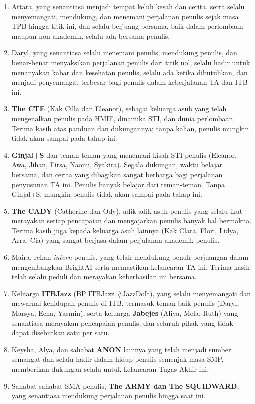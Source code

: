 \begin{enumerate}
    \item Attara, yang senantiasa menjadi tempat keluh kesah dan cerita, serta selalu menyemangati, mendukung, dan menemani perjalanan penulis sejak masa TPB hingga titik ini, dan selalu berjuang bersama, baik dalam perlombaan maupun non-akademik, selalu ada bersama penulis.
    \item Daryl, yang senantiasa selalu menemani penulis, mendukung penulis, dan benar-benar menyaksikan perjalanan penulis dari titik nol, selalu hadir untuk menanyakan kabar dan kesehatan penulis, selalu ada ketika dibutuhkan, dan menjadi penyemangat terbesar bagi penulis dalam keberjalanan TA dan ITB ini.
    \item \textbf{The CTE} (Kak Cilla dan Eleanor), sebagai keluarga asuh yang telah mengenalkan penulis pada HMIF, dinamika STI, dan dunia perlombaan. Terima kasih atas panduan dan dukungannya; tanpa kalian, penulis mungkin tidak akan sampai pada tahap ini.
    \item \textbf{Ginjal+S} dan teman-teman yang menemani kisah STI penulis (Eleanor, Awa, Jihan, Firsa, Naomi, Syakira). Segala dukungan, waktu belajar bersama, dan cerita yang dibagikan sangat berharga bagi perjalanan penyusunan TA ini. Penulis banyak belajar dari teman-teman. Tanpa Ginjal+S, mungkin penulis tidak akan sampai pada tahap ini.
    \item \textbf{The CADY} (Catherine dan Ody), adik-adik asuh penulis yang selalu ikut merayakan setiap pencapaian dan mengajarkan penulis banyak hal bermakna. Terima kasih juga kepada keluarga asuh lainnya (Kak Clara, Flori, Lidya, Arra, Cia) yang sangat berjasa dalam perjalanan akademik penulis.
    \item Maira, rekan \textit{intern} penulis, yang telah mendukung penuh perjuangan dalam mengembangkan BrightAI serta memastikan kelancaran TA ini. Terima kasih telah selalu peduli dan merayakan keberhasilan ini bersama.
    \item Keluarga \textbf{ITBJazz} (BP ITBJazz \#JazzDoIt), yang selalu menyemangati dan mewarnai kehidupan penulis di ITB, termasuk teman baik penulis (Daryl, Marsya, Echa, Yasmin), serta keluarga \textbf{Jabejes} (Aliya, Mela, Ruth) yang senantiasa merayakan pencapaian penulis, dan seluruh pihak yang tidak dapat disebutkan satu per satu.
    \item Keysha, Alya, dan sahabat \textbf{ANON} lainnya yang telah menjadi sumber semangat dan selalu hadir dalam hidup penulis semenjak masa SMP, memberikan dukungan selalu untuk kelancaran Tugas Akhir ini.
    \item Sahabat-sahabat SMA penulis, \textbf{The ARMY dan The SQUIDWARD}, yang senantiasa mendukung perjalanan penulis hingga saat ini.

\end{enumerate}
